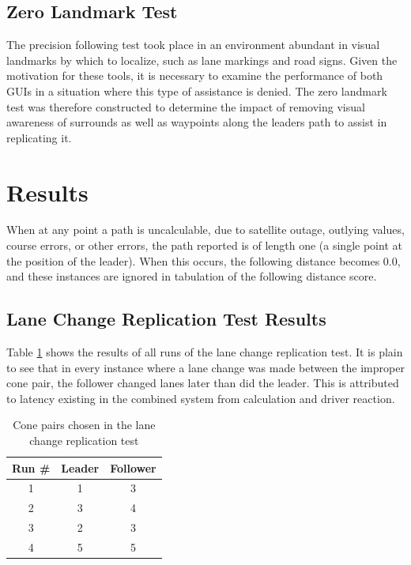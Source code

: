 \subsection{Zero Landmark Test} \label{sec:zerolandmarktest}
The precision following test took place in an environment abundant in visual landmarks by which to localize, such as lane markings and road signs. Given the motivation for these tools, it is necessary to examine the performance of both GUIs in a situation where this type of assistance is denied. The zero landmark test was therefore constructed to determine the impact of removing visual awareness of surrounds as well as waypoints along the leaders path to assist in replicating it.

\section{Results} \label{sec:results}

When at any point a path is uncalculable, due to satellite outage, outlying values, course errors, or other errors, the path reported is of length one (a single point at the position of the leader). When this occurs, the following distance becomes 0.0, and these instances are ignored in tabulation of the following distance score.

\subsection{Lane Change Replication Test Results} \label{sec:lanechangetestresults}

Table \ref{tab:lanechangeresults} shows the results of all runs of the lane change replication test. It is plain to see that in every instance where a lane change was made between the improper cone pair, the follower changed lanes later than did the leader. This is attributed to latency existing in the combined system from calculation and driver reaction.

\begin{table}[htbp] \centering \caption{Cone pairs chosen in the lane change replication test}
\begin{tabular}{c|cc} 
    Run \#  &     Leader&    Follower \\ \hline\hline
    1       &       1   &    3 \\
    2       &       3   &    4   \\
    3       &       2   &    3   \\
    4       &       5   &    5 \\ \hline   
\end{tabular} \label{tab:lanechangeresults} \end{table}

